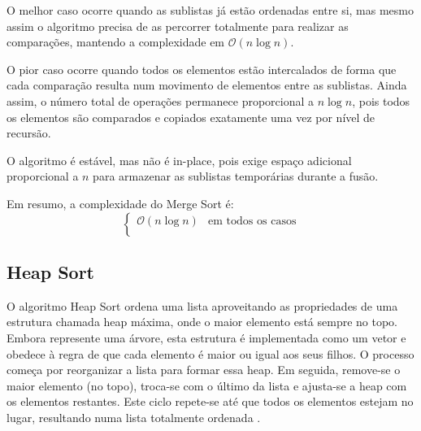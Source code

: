 \documentclass[conference]{IEEEtran}
\begin{document}
O melhor caso ocorre quando as sublistas já estão ordenadas entre si, mas mesmo assim o algoritmo precisa de as percorrer totalmente para realizar as comparações, mantendo a complexidade em \(\mathcal{O}(n \log n)\).

O pior caso ocorre quando todos os elementos estão intercalados de forma que cada comparação resulta num movimento de elementos entre as sublistas. Ainda assim, o número total de operações permanece proporcional a \(n \log n\), pois todos os elementos são comparados e copiados exatamente uma vez por nível de recursão.

O algoritmo é estável, mas não é in-place, pois exige espaço adicional proporcional a \(n\) para armazenar as sublistas temporárias durante a fusão.

Em resumo, a complexidade do Merge Sort é:
\[
\begin{cases}
\mathcal{O}(n \log n) & \text{em todos os casos} \\
\end{cases}
\]

\subsection{Heap Sort}

O algoritmo Heap Sort ordena uma lista aproveitando as propriedades de uma estrutura chamada heap máxima, onde o maior elemento está sempre no topo. Embora represente uma árvore, esta estrutura é implementada como um vetor e obedece à regra de que cada elemento é maior ou igual aos seus filhos. O processo começa por reorganizar a lista para formar essa heap. Em seguida, remove-se o maior elemento (no topo), troca-se com o último da lista e ajusta-se a heap com os elementos restantes. Este ciclo repete-se até que todos os elementos estejam no lugar, resultando numa lista totalmente ordenada \cite{heapsort}.
\end{document}

